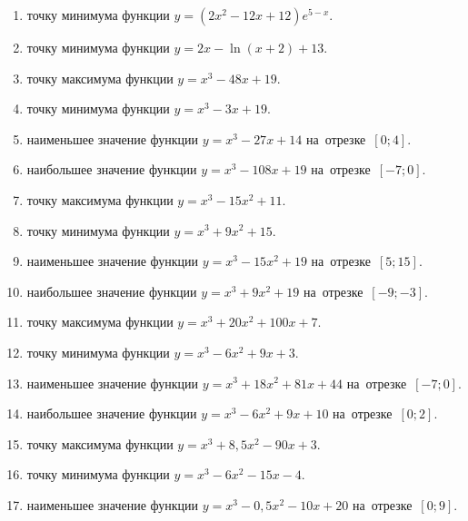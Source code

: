 \documentclass[a4paper,10pt]{article}
\begin{document}
\begin{enumerate}
\item {} точку минимума функции $y=\left(2x^2-12x+12\right){{e}^{5-x}}$.

\item {} точку минимума функции $y=2x-\ln \left(x+2\right)+13$.

\item {} точку максимума функции $y=x^3 -48x +19$.

\item {} точку минимума функции $y=x^3 -3x+19$.

\item {} наименьшее значение функции $y=x^3 -27x+14$ на~отрезке~$\left[0;4\right]$.

\item {} наибольшее значение функции $y=x^3 -108x+19$ на~отрезке~$\left[-7;0\right]$.

\item {} точку максимума функции $y=x^3 -15x^2+11$.

\item {} точку минимума функции $y=x^3 +9x^2+15$.

\item {} наименьшее значение функции $y=x^3 -15x^2+19$ на~отрезке~$\left[5;15\right]$.

\item {} наибольшее значение функции $y=x^3 +9x^2+19$ на~отрезке~$\left[-9;-3\right]$.

\item {} точку максимума функции $y=x^3 +20x^2+100x+7$.

\item {} точку минимума функции $y=x^3 -6x^2+9x+3$.

\item {} наименьшее значение функции $y=x^3 +18x^2+81x+44$ на~отрезке~$\left[-7;0\right]$.

\item {} наибольшее значение функции $y=x^3 -6x^2+9x+10$ на~отрезке~$\left[0;2\right]$.

\item {} точку максимума функции $y=x^3 +8,5x^2-90x+3$.

\item {} точку минимума функции $y=x^3 -6x^2-15x-4$.

\item {} наименьшее значение функции $y=x^3 -0,5x^2-10x+20$ на~отрезке~$\left[0;9\right]$.


\end{enumerate}
\end{document}
